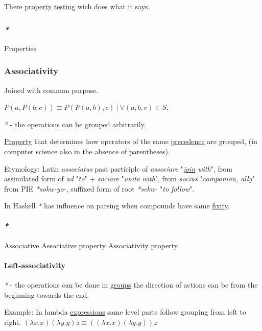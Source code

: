 \documentclass[a4paper,14pt,oneside]{book}
\begin{document}
There \hyperref[orgf795888]{property testing} wich does what it says.

\subsubsection{\emph{*}}
\label{sec:orgd09ca7d}

\label{org700850c}Properties

\subsubsection{\label{org48b1b87}Associativity}
\label{sec:org744efb2}
Joined with common purpose.

\(P(a,P(b,c)) \equiv P(P(a,b),c) \ | \ \forall (a,b,c) \in S\),

\emph{*} - the operations can be grouped arbitrarily.

\hyperref[org638ba9c]{Property} that determines how operators of the same \hyperref[orgd129155]{precedence} are grouped, (in computer science also in the absence of parentheses).

Etymology:
Latin \emph{associatus} past participle of \emph{associare} "\emph{\hyperref[org97f90e6]{join} with}", from assimilated form of \emph{ad} "\emph{to}" + \emph{sociare} "\emph{unite with}", from \emph{socius} "\emph{companion, ally}" from PIE \emph{*sokw-yo-}, suffixed form of root \emph{*sekw-} "\emph{to follow}".

In Haskell \emph{*} has influence on parsing when compounds have same \hyperref[org6cadaf6]{fixity}.

\paragraph{\emph{*}}
\label{sec:org9f05764}

\label{org4adab76}Associative
\label{org0054d43}Associative property
\label{org28b72c5}Associativity property

\paragraph{\label{orgd44342a}Left-associativity}
\label{sec:orgad0fc15}
\emph{*} - the operations can be done in \hyperref[org8052e93]{groups} the direction of actions can be from the beginning towards the end.

Example:
In lambda \hyperref[org41ce9e1]{expressions} same level parts follow grouping from left to right.
\((\lambda x . x)(\lambda y . y)z \equiv ((\lambda x . x)(\lambda y . y))z\)
\end{document}
